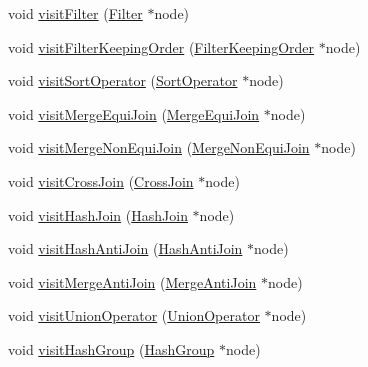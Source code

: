 \begin{DoxyCompactItemize}
\item 
void \hyperlink{class_bobox_plan_writing_physical_operator_visitor_a443e89add4155e51b2d7d1973afb3af5}{visit\+Filter} (\hyperlink{class_filter}{Filter} $\ast$node)
\item 
void \hyperlink{class_bobox_plan_writing_physical_operator_visitor_a041f79a1705915af0d45e623ad7a18ac}{visit\+Filter\+Keeping\+Order} (\hyperlink{class_filter_keeping_order}{Filter\+Keeping\+Order} $\ast$node)
\item 
void \hyperlink{class_bobox_plan_writing_physical_operator_visitor_ac482fb6eae4e0bcb957bad6c572a2c03}{visit\+Sort\+Operator} (\hyperlink{class_sort_operator}{Sort\+Operator} $\ast$node)
\item 
void \hyperlink{class_bobox_plan_writing_physical_operator_visitor_ac66108bf441456b57aded81ac17b111b}{visit\+Merge\+Equi\+Join} (\hyperlink{class_merge_equi_join}{Merge\+Equi\+Join} $\ast$node)
\item 
void \hyperlink{class_bobox_plan_writing_physical_operator_visitor_a75a1a20aecd434d712dff1867bf5ec37}{visit\+Merge\+Non\+Equi\+Join} (\hyperlink{class_merge_non_equi_join}{Merge\+Non\+Equi\+Join} $\ast$node)
\item 
void \hyperlink{class_bobox_plan_writing_physical_operator_visitor_a882ad63c59098b1bca68fca5d36b8871}{visit\+Cross\+Join} (\hyperlink{class_cross_join}{Cross\+Join} $\ast$node)
\item 
void \hyperlink{class_bobox_plan_writing_physical_operator_visitor_a5616d43abbe0666c854342af2d3aec94}{visit\+Hash\+Join} (\hyperlink{class_hash_join}{Hash\+Join} $\ast$node)
\item 
void \hyperlink{class_bobox_plan_writing_physical_operator_visitor_a01ed46af47fc5c7fb7af2b6b5b2483ba}{visit\+Hash\+Anti\+Join} (\hyperlink{class_hash_anti_join}{Hash\+Anti\+Join} $\ast$node)
\item 
void \hyperlink{class_bobox_plan_writing_physical_operator_visitor_a0346b44be20be9fb68d95029908808f6}{visit\+Merge\+Anti\+Join} (\hyperlink{class_merge_anti_join}{Merge\+Anti\+Join} $\ast$node)
\item 
void \hyperlink{class_bobox_plan_writing_physical_operator_visitor_a87c2ddbe5d05b7dcc30c9d61d540d1f5}{visit\+Union\+Operator} (\hyperlink{class_union_operator}{Union\+Operator} $\ast$node)
\item 
void \hyperlink{class_bobox_plan_writing_physical_operator_visitor_a1e114b9a6e5bf08a691a9197f03efe9d}{visit\+Hash\+Group} (\hyperlink{class_hash_group}{Hash\+Group} $\ast$node)
\item 

\end{DoxyCompactItemize}
